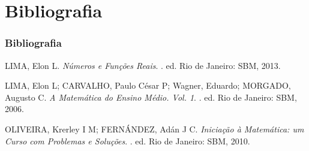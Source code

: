 \section{Bibliografia}


\begin{frame}
    \frametitle{Bibliografia}

    \begin{thebibliography}{99}
        LIMA, Elon L.
        \newblock \emph{Números e Funções Reais}.
        . ed. Rio de Janeiro: SBM, 2013.

        LIMA, Elon L; CARVALHO, Paulo César P; Wagner, Eduardo; MORGADO,
        Augusto C.
        \newblock \emph{A Matemática do Ensino Médio. Vol. 1}.
        . ed. Rio de Janeiro: SBM, 2006.

        OLIVEIRA, Krerley I M; FERNÁNDEZ, Adán J C.
        \newblock \emph{Iniciação à Matemática: um Curso com Problemas e Soluções}.
        . ed. Rio de Janeiro: SBM, 2010.
    \end{thebibliography}
\end{frame}
